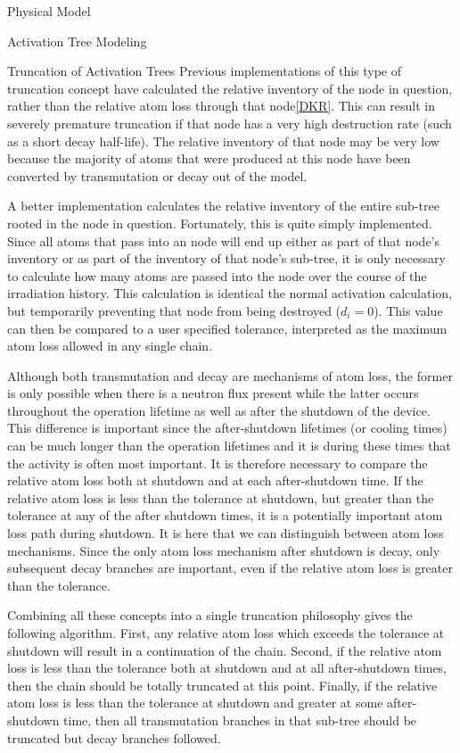 \begin{chapter}{Physical Model\label{chap:physical}}
\begin{section}{Activation Tree Modeling\label{sec:physical.chains}}
\begin{subsection}{Truncation of Activation Trees}
    Previous implementations of this type of truncation concept have
    calculated the relative inventory of the node in question, rather
    than the relative atom loss through that node\ref{DKR}.  This can
    result in severely premature truncation if that node has a very
    high destruction rate (such as a short decay half-life).  The
    relative inventory of that node may be very low because the
    majority of atoms that were produced at this node have been
    converted by transmutation or decay out of the model.
    
    A better implementation calculates the relative inventory of the
    entire sub-tree rooted in the node in question.  Fortunately, this
    is quite simply implemented.  Since all atoms that pass into an
    node will end up either as part of that node's inventory or as
    part of the inventory of that node's sub-tree, it is only
    necessary to calculate how many atoms are passed into the node
    over the course of the irradiation history.  This calculation is
    identical the normal activation calculation, but temporarily
    preventing that node from being destroyed ($d_i = 0$).  This value
    can then be compared to a user specified tolerance, interpreted as
    the maximum atom loss allowed in any single chain.
    
    Although both transmutation and decay are mechanisms of atom loss,
    the former is only possible when there is a neutron flux present
    while the latter occurs throughout the operation lifetime as well
    as after the shutdown of the device.  This difference is important
    since the after-shutdown lifetimes (or cooling times) can be much
    longer than the operation lifetimes and it is during these times
    that the activity is often most important.  It is therefore
    necessary to compare the relative atom loss both at shutdown and
    at each after-shutdown time.  If the relative atom loss is less
    than the tolerance at shutdown, but greater than the tolerance at
    any of the after shutdown times, it is a potentially important
    atom loss path during shutdown.  It is here that we can
    distinguish between atom loss mechanisms.  Since the only atom
    loss mechanism after shutdown is decay, only subsequent decay
    branches are important, even if the relative atom loss is greater
    than the tolerance.

    Combining all these concepts into a single truncation philosophy
    gives the following algorithm.  First, any relative atom loss
    which exceeds the tolerance at shutdown will result in a
    continuation of the chain.  Second, if the relative atom loss is
    less than the tolerance both at shutdown and at all after-shutdown
    times, then the chain should be totally truncated at this point.
    Finally, if the relative atom loss is less than the tolerance at
    shutdown and greater at some after-shutdown time, then all
    transmutation branches in that sub-tree should be truncated but
    decay branches followed.
    

\end{subsection}
\end{section}
\end{chapter}
